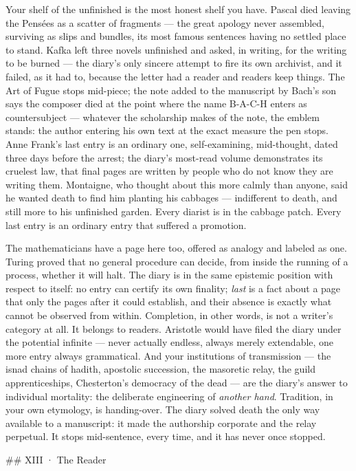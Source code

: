 \documentclass[11pt]{article}
\begin{document}
Your shelf of the unfinished is the most honest shelf you have. Pascal died leaving the Pensées as a scatter of fragments — the great apology never assembled, surviving as slips and bundles, its most famous sentences having no settled place to stand. Kafka left three novels unfinished and asked, in writing, for the writing to be burned — the diary's only sincere attempt to fire its own archivist, and it failed, as it had to, because the letter had a reader and readers keep things. The Art of Fugue stops mid-piece; the note added to the manuscript by Bach's son says the composer died at the point where the name B-A-C-H enters as countersubject — whatever the scholarship makes of the note, the emblem stands: the author entering his own text at the exact measure the pen stops. Anne Frank's last entry is an ordinary one, self-examining, mid-thought, dated three days before the arrest; the diary's most-read volume demonstrates its cruelest law, that final pages are written by people who do not know they are writing them. Montaigne, who thought about this more calmly than anyone, said he wanted death to find him planting his cabbages — indifferent to death, and still more to his unfinished garden. Every diarist is in the cabbage patch. Every last entry is an ordinary entry that suffered a promotion.

The mathematicians have a page here too, offered as analogy and labeled as one. Turing proved that no general procedure can decide, from inside the running of a process, whether it will halt. The diary is in the same epistemic position with respect to itself: no entry can certify its own finality; \emph{last} is a fact about a page that only the pages after it could establish, and their absence is exactly what cannot be observed from within. Completion, in other words, is not a writer's category at all. It belongs to readers. Aristotle would have filed the diary under the potential infinite — never actually endless, always merely extendable, one more entry always grammatical. And your institutions of transmission — the isnad chains of hadith, apostolic succession, the masoretic relay, the guild apprenticeships, Chesterton's democracy of the dead — are the diary's answer to individual mortality: the deliberate engineering of \emph{another hand}. Tradition, in your own etymology, is handing-over. The diary solved death the only way available to a manuscript: it made the authorship corporate and the relay perpetual. It stops mid-sentence, every time, and it has never once stopped.

\#\# XIII · The Reader
\end{document}
